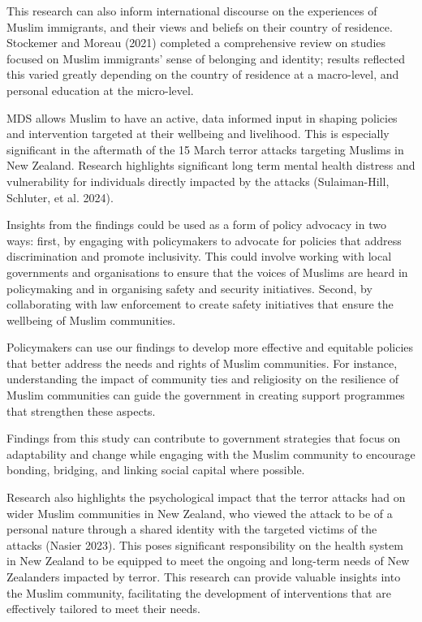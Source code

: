 \documentclass[
]{interact}
\begin{document}
This research can also inform international discourse on the experiences
of Muslim immigrants, and their views and beliefs on their country of
residence. Stockemer and Moreau (2021) completed a comprehensive review
on studies focused on Muslim immigrants' sense of belonging and
identity; results reflected this varied greatly depending on the country
of residence at a macro-level, and personal education at the
micro-level.

MDS allows Muslim to have an active, data informed input in shaping
policies and intervention targeted at their wellbeing and livelihood.
This is especially significant in the aftermath of the 15 March terror
attacks targeting Muslims in New Zealand. Research highlights
significant long term mental health distress and vulnerability for
individuals directly impacted by the attacks (Sulaiman-Hill, Schluter,
et al. 2024).

Insights from the findings could be used as a form of policy advocacy in
two ways: first, by engaging with policymakers to advocate for policies
that address discrimination and promote inclusivity. This could involve
working with local governments and organisations to ensure that the
voices of Muslims are heard in policymaking and in organising safety and
security initiatives. Second, by collaborating with law enforcement to
create safety initiatives that ensure the wellbeing of Muslim
communities.

Policymakers can use our findings to develop more effective and
equitable policies that better address the needs and rights of Muslim
communities. For instance, understanding the impact of community ties
and religiosity on the resilience of Muslim communities can guide the
government in creating support programmes that strengthen these aspects.

Findings from this study can contribute to government strategies that
focus on adaptability and change while engaging with the Muslim
community to encourage bonding, bridging, and linking social capital
where possible.

Research also highlights the psychological impact that the terror
attacks had on wider Muslim communities in New Zealand, who viewed the
attack to be of a personal nature through a shared identity with the
targeted victims of the attacks (Nasier 2023). This poses significant
responsibility on the health system in New Zealand to be equipped to
meet the ongoing and long-term needs of New Zealanders impacted by
terror. This research can provide valuable insights into the Muslim
community, facilitating the development of interventions that are
effectively tailored to meet their needs.
\end{document}
